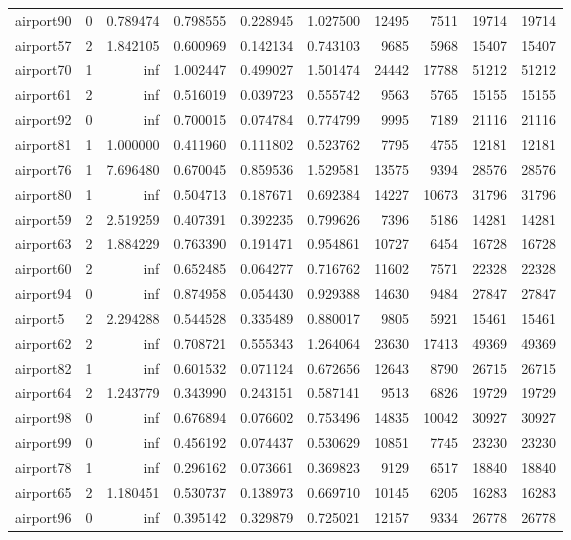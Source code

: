 \begin{longtable}{|l|r|r|r|r|r|r|r|r|r|}
airport90 & 0 & 0.789474 & 0.798555 & 0.228945 & 1.027500 & 12495 & 7511 & 19714 & 19714 \\
airport57 & 2 & 1.842105 & 0.600969 & 0.142134 & 0.743103 & 9685 & 5968 & 15407 & 15407 \\
airport70 & 1 & inf & 1.002447 & 0.499027 & 1.501474 & 24442 & 17788 & 51212 & 51212 \\
airport61 & 2 & inf & 0.516019 & 0.039723 & 0.555742 & 9563 & 5765 & 15155 & 15155 \\
airport92 & 0 & inf & 0.700015 & 0.074784 & 0.774799 & 9995 & 7189 & 21116 & 21116 \\
airport81 & 1 & 1.000000 & 0.411960 & 0.111802 & 0.523762 & 7795 & 4755 & 12181 & 12181 \\
airport76 & 1 & 7.696480 & 0.670045 & 0.859536 & 1.529581 & 13575 & 9394 & 28576 & 28576 \\
airport80 & 1 & inf & 0.504713 & 0.187671 & 0.692384 & 14227 & 10673 & 31796 & 31796 \\
airport59 & 2 & 2.519259 & 0.407391 & 0.392235 & 0.799626 & 7396 & 5186 & 14281 & 14281 \\
airport63 & 2 & 1.884229 & 0.763390 & 0.191471 & 0.954861 & 10727 & 6454 & 16728 & 16728 \\
airport60 & 2 & inf & 0.652485 & 0.064277 & 0.716762 & 11602 & 7571 & 22328 & 22328 \\
airport94 & 0 & inf & 0.874958 & 0.054430 & 0.929388 & 14630 & 9484 & 27847 & 27847 \\
airport5 & 2 & 2.294288 & 0.544528 & 0.335489 & 0.880017 & 9805 & 5921 & 15461 & 15461 \\
airport62 & 2 & inf & 0.708721 & 0.555343 & 1.264064 & 23630 & 17413 & 49369 & 49369 \\
airport82 & 1 & inf & 0.601532 & 0.071124 & 0.672656 & 12643 & 8790 & 26715 & 26715 \\
airport64 & 2 & 1.243779 & 0.343990 & 0.243151 & 0.587141 & 9513 & 6826 & 19729 & 19729 \\
airport98 & 0 & inf & 0.676894 & 0.076602 & 0.753496 & 14835 & 10042 & 30927 & 30927 \\
airport99 & 0 & inf & 0.456192 & 0.074437 & 0.530629 & 10851 & 7745 & 23230 & 23230 \\
airport78 & 1 & inf & 0.296162 & 0.073661 & 0.369823 & 9129 & 6517 & 18840 & 18840 \\
airport65 & 2 & 1.180451 & 0.530737 & 0.138973 & 0.669710 & 10145 & 6205 & 16283 & 16283 \\
airport96 & 0 & inf & 0.395142 & 0.329879 & 0.725021 & 12157 & 9334 & 26778 & 26778 \\

\end{longtable}
